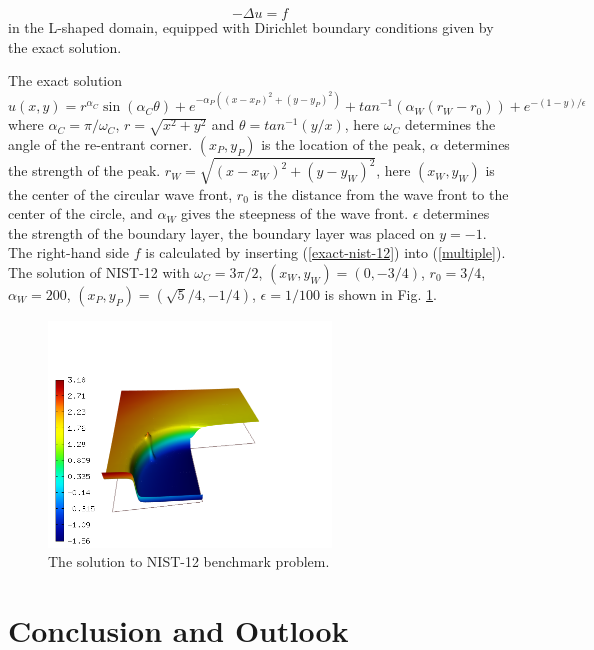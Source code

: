 \documentclass[12pt]{elsarticle}
\begin{document}
\begin{equation} \label{multiple}
-\Delta u = f
\end{equation}
in the L-shaped domain, equipped with Dirichlet boundary conditions
given by the exact solution.

The exact solution
\begin{equation}\label{exact-nist-12}
u(x,y) =  r^{\alpha_{C} }\sin(\alpha_{C} \theta)
+ e^{-\alpha_{P} ((x - x_{P})^{2} + (y - y_{P})^{2})}
+ tan^{-1}(\alpha_{W} (r_{W} - r_{0}))
+ e^{-(1 - y) / \epsilon}
\end{equation}
where $\alpha_C = \pi / \omega_C$, $r = \sqrt{x^2+y^2}$
and $\theta = tan^{-1}(y/x)$, here $\omega_C$ determines
the angle of the re-entrant corner.
$(x_{P}, y_{P})$ is the location of the peak, $\alpha$
determines the strength of the peak.
$r_{W} = \sqrt{(x - x_{W})^{2} + (y - y_{W})^{2}}$,
here $(x_{W}, y_{W})$ is the center of the circular wave front,
$r_{0}$ is the distance from the wave front to the
center of the circle, and $\alpha_W$ gives
the steepness of the wave front. $\epsilon$ determines the
strength of the boundary layer, the boundary layer was placed on $y = -1$.
The right-hand side $f$ is calculated by inserting (\ref{exact-nist-12})
into (\ref{multiple}). \\

The solution of NIST-12 with $\omega_C = 3 \pi /2$,
$(x_{W}, y_{W}) = (0, -3/4)$, $r_{0} = 3/4$, $\alpha_{W} = 200$,
$(x_{P}, y_{P}) = (\sqrt{5} / 4, -1/4)$,
$\epsilon = 1/100$ is shown in Fig. \ref{fig:sln-nist12}.

\begin{figure}[!ht]
\centering
\includegraphics[height=6cm]{nist/nist-12/solution.png}
\caption{The solution to NIST-12 benchmark problem.}
\label{fig:sln-nist12}
\end{figure}

\section{Conclusion and Outlook}
\label{sec:conclusion}
\end{document}
